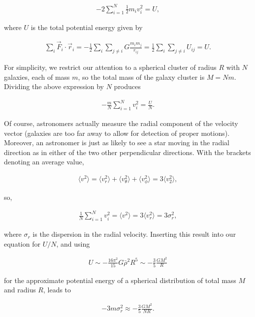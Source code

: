 \documentclass[a4paper,10pt]{article}
\begin{document}
\begin{align*}
    -2\sum_{i=1}^N \frac{1}{2}m_iv_i^2 = U,
\end{align*}

{\noindent}where $U$ is the total potential energy given by

\begin{align*}
    \sum_i \vec{F}_i\cdot\vec{r}_i = -\frac{1}{2}\sum_i\sum_{j\neq i} G\frac{m_im_j}{r_{ij}} = \frac{1}{2}\sum_i\sum_{j\neq i}U_{ij} = U.
\end{align*}

{\noindent}For simplicity, we restrict our attention to a spherical cluster of radius $R$ with $N$ galaxies, each of mass $m$, so the total mass of the galaxy cluster is $M=Nm$. Dividing the above expression by $N$ produces

\begin{align*}
    -\frac{m}{N}\sum_{i=1}^Nv_i^2 = \frac{U}{N}.
\end{align*}

{\noindent}Of course, astronomers actually measure the radial component of the velocity vector (galaxies are too far away to allow for detection of proper motions). Moreover, an astronomer is just as likely to see a star moving in the radial direction as in either of the two other perpendicular directions. With the brackets denoting an average value,

\begin{align*}
    \langle v^2\rangle = \langle v_r^2\rangle + \langle v_\theta^2\rangle + \langle v_\phi^2\rangle = 3\langle v_2^2\rangle,
\end{align*}

{\noindent}so,

\begin{align*}
    \frac{1}{N}\sum_{i=1}^Nv_i^2 = \langle v^2\rangle = 3\langle v_r^2\rangle = 3\sigma_r^2,
\end{align*}

{\noindent}where $\sigma_r$ is the dispersion in the radial velocity. Inserting this result into our equation for $U/N$, and using

\begin{align*}
    U \sim -\frac{16\pi^2}{15}G\bar{\rho}^2R^5 \sim -\frac{3}{5}\frac{GM^2}{R}
\end{align*}

for the approximate potential energy of a spherical distribution of total mass $M$ and radius $R$, leads to

\begin{align*}
    -3m\sigma_r^2 \approx -\frac{3}{5}\frac{GM^2}{NR}.
\end{align*}
\end{document}

